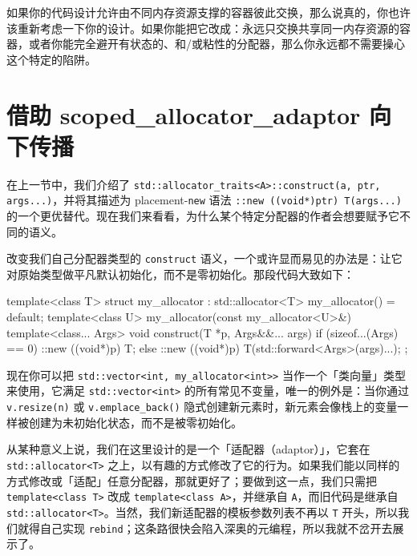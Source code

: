 如果你的代码设计允许由不同内存资源支撑的容器彼此交换，那么说真的，你也许该重新考虑一下你的设计。如果你能把它改成：永远只交换共享同一内存资源的容器，或者你能完全避开有状态的、和/或粘性的分配器，那么你永远都不需要操心这个特定的陷阱。

\section{借助 scoped\_\allowbreak{}allocator\_\allowbreak{}adaptor 向下传播}

在上一节中，我们介绍了 \texttt{std::\allowbreak{}allocator\_\allowbreak{}traits<\allowbreak{}A>\allowbreak{}::\allowbreak{}construct(\allowbreak{}a,\allowbreak{} ptr,\allowbreak{} args...)\allowbreak{}}，并将其描述为 placement-\texttt{new} 语法 \texttt{::\allowbreak{}new (\allowbreak{}(\allowbreak{}void*)\allowbreak{}ptr)\allowbreak{} T(\allowbreak{}args...)\allowbreak{}} 的一个更优替代。现在我们来看看，为什么某个特定分配器的作者会想要赋予它不同的语义。

改变我们自己分配器类型的 \texttt{construct} 语义，一个或许显而易见的办法是：让它对原始类型做平凡默认初始化，而不是零初始化。那段代码大致如下：

\begin{codebox}[cpp]
    template<class T>
    struct my_allocator : std::allocator<T>
    {
      my_allocator() = default;
      template<class U>
      my_allocator(const my_allocator<U>&) {}
      template<class... Args>
      void construct(T *p, Args&&... args) {
        if (sizeof...(Args) == 0) {
          ::new ((void*)p) T;
        } else {
          ::new ((void*)p) T(std::forward<Args>(args)...);
        }
      }
    };
\end{codebox}

现在你可以把 \texttt{std::\allowbreak{}vector<\allowbreak{}int,\allowbreak{} my\_\allowbreak{}allocator<\allowbreak{}int>\allowbreak{}>} 当作一个「类向量」类型来使用，它满足 \texttt{std::\allowbreak{}vector<\allowbreak{}int>\allowbreak{}} 的所有常见不变量，唯一的例外是：当你通过 \texttt{v.\allowbreak{}resize(\allowbreak{}n)\allowbreak{}} 或 \texttt{v.\allowbreak{}emplace\_\allowbreak{}back(\allowbreak{})\allowbreak{}} 隐式创建新元素时，新元素会像栈上的变量一样被创建为未初始化状态，而不是被零初始化。

从某种意义上说，我们在这里设计的是一个「适配器（adaptor）」，它套在 \texttt{std::\allowbreak{}allocator<\allowbreak{}T>\allowbreak{}} 之上，以有趣的方式修改了它的行为。如果我们能以同样的方式修改或「适配」任意分配器，那就更好了；要做到这一点，我们只需把 \texttt{template<\allowbreak{}class T>\allowbreak{}} 改成 \texttt{template<\allowbreak{}class A>\allowbreak{}}，并继承自 \texttt{A}，而旧代码是继承自 \texttt{std::\allowbreak{}allocator<\allowbreak{}T>\allowbreak{}}。当然，我们新适配器的模板参数列表不再以 \texttt{T} 开头，所以我们就得自己实现 \texttt{rebind}；这条路很快会陷入深奥的元编程，所以我就不岔开去展示了。

